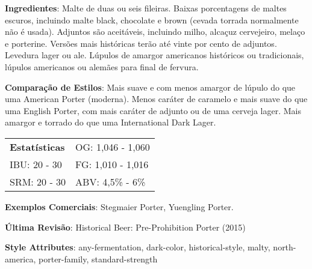 \textbf{Ingredientes}: Malte de duas ou seis fileiras. Baixas porcentagens de maltes escuros, incluindo malte black, chocolate e brown (cevada torrada normalmente não é usada). Adjuntos são aceitáveis, incluindo milho, alcaçuz cervejeiro, melaço e porterine. Versões mais históricas terão até vinte por cento de adjuntos. Levedura lager ou ale. Lúpulos de amargor americanos históricos ou tradicionais, lúpulos americanos ou alemães para final de fervura.

\textbf{Comparação de Estilos}: Mais suave e com menos amargor de lúpulo do que uma American Porter (moderna). Menos caráter de caramelo e mais suave do que uma English Porter, com mais caráter de adjunto ou de uma cerveja lager. Mais amargor e torrado do que uma International Dark Lager.

\begin{tabular}{@{}p{35mm}p{35mm}@{}}
  \textbf{Estatísticas} & OG: 1,046 - 1,060  \\
  IBU: 20 - 30  & FG: 1,010 - 1,016  \\
  SRM: 20 - 30 & ABV: 4,5\% - 6\%
\end{tabular}

\textbf{Exemplos Comerciais}: Stegmaier Porter, Yuengling Porter.

\textbf{Última Revisão}: Historical Beer: Pre-Prohibition Porter (2015)

\textbf{Style Attributes}: any-fermentation, dark-color, historical-style, malty, north-america, porter-family, standard-strength
